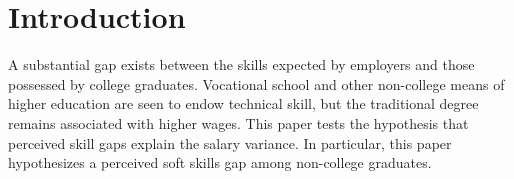 \documentclass[review]{elsarticle}
\begin{document}
\pagebreak
\linenumbers

\section{Introduction}

A substantial gap exists between the skills expected by employers and those possessed by college graduates\cite{mcgarry2016examination, malik2017great, abbasi2018analysis, gingras2000there}.
Vocational school and other non-college means of higher education are seen to endow technical skill,
but the traditional degree remains associated with higher wages.
This paper tests the hypothesis that perceived skill gaps explain the salary variance.
In particular, this paper hypothesizes a perceived soft skills gap among non-college graduates.


\end{document}
